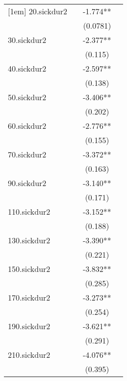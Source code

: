 \begin{table}[htbp]
\begin{tabular}{l*{3}{c}}
[1em]
20.sickdur2 &              &      -1.774**&              \\
            &              &    (0.0781)  &              \\
[1em]
30.sickdur2 &              &      -2.377**&              \\
            &              &     (0.115)  &              \\
[1em]
40.sickdur2 &              &      -2.597**&              \\
            &              &     (0.138)  &              \\
[1em]
50.sickdur2 &              &      -3.406**&              \\
            &              &     (0.202)  &              \\
[1em]
60.sickdur2 &              &      -2.776**&              \\
            &              &     (0.155)  &              \\
[1em]
70.sickdur2 &              &      -3.372**&              \\
            &              &     (0.163)  &              \\
[1em]
90.sickdur2 &              &      -3.140**&              \\
            &              &     (0.171)  &              \\
[1em]
110.sickdur2&              &      -3.152**&              \\
            &              &     (0.188)  &              \\
[1em]
130.sickdur2&              &      -3.390**&              \\
            &              &     (0.221)  &              \\
[1em]
150.sickdur2&              &      -3.832**&              \\
            &              &     (0.285)  &              \\
[1em]
170.sickdur2&              &      -3.273**&              \\
            &              &     (0.254)  &              \\
[1em]
190.sickdur2&              &      -3.621**&              \\
            &              &     (0.291)  &              \\
[1em]
210.sickdur2&              &      -4.076**&              \\
            &              &     (0.395)  &              \\

\end{tabular}
\end{table}
